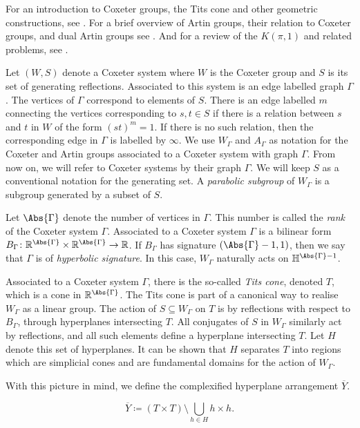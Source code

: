 For an introduction to Coxeter groups, the Tits cone and other geometric constructions, see \cite{humphreys_reflection_1990}.
For a brief overview of Artin groups, their relation to Coxeter groups, and dual Artin groups see \cite[Sections 1,2]{paolini_salvetti_kpi1_2021}.
And for a review of the $K(\pi,1)$ and related problems, see \cite{paris_kpi1_2014}.

Let $(W,S)$ denote a Coxeter system where $W$ is the Coxeter group and $S$ is its set of generating reflections.
Associated to this system is an edge labelled graph $\Gamma$.
The vertices of  $\Gamma$ correspond to elements of  $S$.
There is an edge labelled $m$ connecting the vertices corresponding to $s,t\in S$ if there is a relation between $s$ and  $t$ in  $W$ of the form  $(st)^m=1$.
If there is no such relation, then the corresponding edge in $\Gamma$ is labelled by $\infty$.
We use $W_\Gamma$ and  $A_\Gamma$  as notation for the Coxeter and Artin groups associated to a Coxeter system with graph $\Gamma$.
From now on, we will refer to Coxeter systems by their graph $\Gamma$.
We will keep $S$ as a conventional notation for the generating set.
A \emph{parabolic subgroup} of $W_\Gamma$ is a subgroup generated by a subset of $S$.


Let $\Abs{\Gamma}$ denote the number of vertices in $\Gamma$.
This number is called the \emph{rank} of the Coxeter system $\Gamma$.
Associated to a Coxeter system  $\Gamma$ is a bilinear form $B_\Gamma \colon \R^{\Abs{\Gamma}} \times \R^{\Abs{\Gamma}} \to \R$.
If  $B_\Gamma$ has signature $(\Abs{\Gamma}-1,1)$, then we say that  $\Gamma$ is of \emph{hyperbolic signature}.
In this case, $W_\Gamma$ naturally acts on  $\Hbb^{\Abs{\Gamma}-1}$.

Associated to a Coxeter system $\Gamma$, there is the so-called \emph{Tits cone}, denoted $T$, which is a cone in $\R^{\Abs{\Gamma}}$.
The Tits cone is part of a canonical way to realise $W_\Gamma$ as a linear group.
The action of $S \subseteq W_\Gamma$ on  $T$ is by reflections with respect to $B_\Gamma$, through hyperplanes intersecting $T$.
All conjugates of $S$ in $W_\Gamma$ similarly act by reflections, and all such elements define a hyperplane intersecting $T$.
Let $H$ denote this set of hyperplanes.
It can be shown that $H$ separates  $T$ into regions which are simplicial cones and are fundamental domains for the action of  $W_\Gamma$.

With this picture in mind, we define the complexified hyperplane arrangement $\overline{Y}$.

\[
	\overline{Y} \coloneq \left(T \times T\right) \setminus \bigcup_{h \in H} h \times h
	.\]

